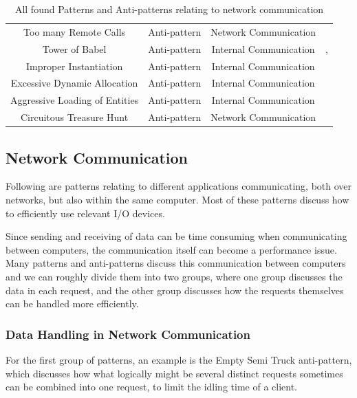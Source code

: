 \documentclass[a4paper,UKenglish]{dagrep}
\begin{document}
\begin{table}[H]
\begin{tabular}{c|ccc}
		Too many Remote Calls             & Anti-pattern & Network Communication      & \cite{framework_assessing_antipatterns}                 \\
		Tower of Babel                    & Anti-pattern & Internal Communication      & \cite{more_se_antipatterns},\cite{detect_antipatterns}  \\
		Improper Instantiation            & Anti-pattern & Internal Communication      & \cite{MicrosoftAntipatterns}                            \\
		Excessive Dynamic Allocation      & Anti-pattern & Internal Communication      & \cite{detect_antipatterns}                              \\
		Aggressive Loading of Entities    & Anti-pattern & Internal Communication      & \cite{framework_assessing_antipatterns}                 \\
		Circuitous Treasure Hunt          & Anti-pattern & Network Communication      & \cite{detect_antipatterns}                              \\
	\end{tabular}
	\caption{All found Patterns and Anti-patterns relating to network communication}
	\label{tab:patterns}
\end{table}


\subsection{Network Communication}
Following are patterns relating to different applications communicating, both over networks, but also within the same computer. Most of these patterns discuss how to efficiently use relevant I/O devices.

Since sending and receiving of data can be time consuming when communicating between computers, the communication itself can become a performance issue. Many patterns and anti-patterns discuss this communication between computers and we can roughly divide them into two groups, where one group discusses the data in each request, and the other group discusses how the requests themselves can be handled more efficiently.

\subsubsection{Data Handling in Network Communication}

For the first group of patterns, an example is the Empty Semi Truck anti-pattern, which discusses how what logically might be several distinct requests sometimes can be combined into one request, to limit the idling time of a client.
\end{document}
